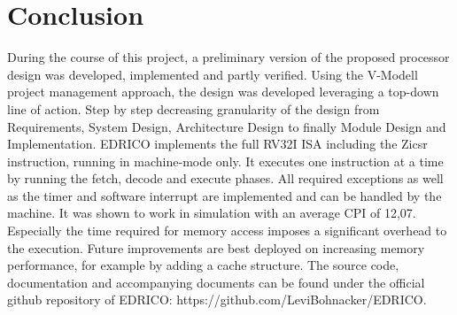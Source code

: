\chapter{Conclusion}
During the course of this project, a preliminary version of the proposed processor design was developed, implemented and partly verified. Using the V-Modell project management approach, the design was developed leveraging a top-down line of action. Step by step decreasing granularity of the design from Requirements, System Design, Architecture Design to finally Module Design and Implementation. \ac{EDRICO} implements the full \ac{RV32I} \ac{ISA} including the Zicsr instruction, running in machine-mode only. It executes one instruction at a time by running the fetch, decode and execute phases. All required exceptions as well as the timer and software interrupt are implemented and can be handled by the machine. It was shown to work in simulation with an average \ac{CPI} of 12,07. Especially the time required for memory access imposes a significant overhead to the execution. Future improvements are best deployed on increasing memory performance, for example by adding a cache structure. The source code, documentation and accompanying documents can be found under the official github repository of \ac{EDRICO}: https://github.com/LeviBohnacker/EDRICO.
